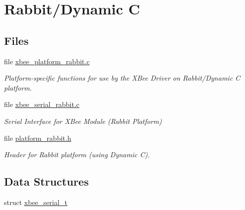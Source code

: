 \hypertarget{group__hal__rabbit}{\section{Rabbit/\-Dynamic C}
\label{group__hal__rabbit}
}
\subsection*{Files}
\begin{DoxyCompactItemize}
\item 
file \hyperlink{xbee__platform__rabbit_8c}{xbee\-\_\-platform\-\_\-rabbit.\-c}
\begin{DoxyCompactList}\small\item\em Platform-\/specific functions for use by the X\-Bee Driver on Rabbit/\-Dynamic C platform. \end{DoxyCompactList}\item 
file \hyperlink{xbee__serial__rabbit_8c}{xbee\-\_\-serial\-\_\-rabbit.\-c}
\begin{DoxyCompactList}\small\item\em Serial Interface for X\-Bee Module (Rabbit Platform) \end{DoxyCompactList}\item 
file \hyperlink{platform__rabbit_8h}{platform\-\_\-rabbit.\-h}
\begin{DoxyCompactList}\small\item\em Header for Rabbit platform (using Dynamic C). \end{DoxyCompactList}\end{DoxyCompactItemize}
\subsection*{Data Structures}
\begin{DoxyCompactItemize}
\item 
struct \hyperlink{structxbee__serial__t}{xbee\-\_\-serial\-\_\-t}
\end{DoxyCompactItemize}
